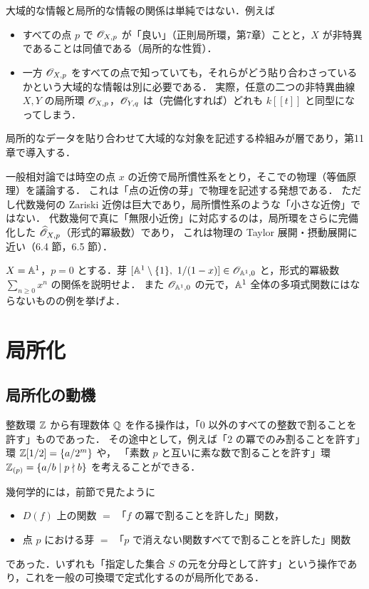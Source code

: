 大域的な情報と局所的な情報の関係は単純ではない．例えば
\begin{itemize}
  \item すべての点 $p$ で $\mathscr{O}_{X,p}$ が「良い」（正則局所環，第7章）ことと，$X$ が非特異であることは同値である（局所的な性質）．
  \item 一方 $\mathscr{O}_{X,p}$ をすべての点で知っていても，それらがどう貼り合わさっているかという大域的な情報は別に必要である．
        実際，任意の二つの非特異曲線 $X,Y$ の局所環 $\mathscr{O}_{X,p}$，$\mathscr{O}_{Y,q}$ は（完備化すれば）どれも $k[[t]]$ と同型になってしまう．
\end{itemize}
局所的なデータを貼り合わせて大域的な対象を記述する枠組みが層であり，第11章で導入する．

\begin{physbox}[局所座標と場]
一般相対論では時空の点 $x$ の近傍で局所慣性系をとり，そこでの物理（等価原理）を議論する．
これは「点の近傍の芽」で物理を記述する発想である．
ただし代数幾何の Zariski 近傍は巨大であり，局所慣性系のような「小さな近傍」ではない．
代数幾何で真に「無限小近傍」に対応するのは，局所環をさらに完備化した $\widehat{\mathscr{O}}_{X,p}$（形式的冪級数）であり，
これは物理の Taylor 展開・摂動展開に近い（6.4 節，6.5 節）．
\end{physbox}

$X=\mathbb{A}^1$，$p=0$ とする．芽 $[\A^1\setminus\{1\},\ 1/(1-x)]\in\OO_{\A^1,0}$ と，形式的冪級数 $\sum_{n\ge0}x^n$ の関係を説明せよ．
また $\mathscr{O}_{\mathbb{A}^1,0}$ の元で，$\mathbb{A}^1$ 全体の多項式関数にはならないものの例を挙げよ．

\section{局所化}

\subsection{局所化の動機}

整数環 $\mathbb{Z}$ から有理数体 $\mathbb{Q}$ を作る操作は，「$0$ 以外のすべての整数で割ることを許す」ものであった．
その途中として，例えば「$2$ の冪でのみ割ることを許す」環 $\mathbb{Z}[1/2]=\{a/2^m\}$ や，
「素数 $p$ と互いに素な数で割ることを許す」環 $\mathbb{Z}_{(p)}=\{a/b\mid p\nmid b\}$ を考えることができる．

幾何学的には，前節で見たように
\begin{itemize}
  \item $D(f)$ 上の関数 $=$ 「$f$ の冪で割ることを許した」関数，
  \item 点 $p$ における芽 $=$ 「$p$ で消えない関数すべてで割ることを許した」関数
\end{itemize}
であった．いずれも「指定した集合 $S$ の元を分母として許す」という操作であり，これを一般の可換環で定式化するのが局所化である．

